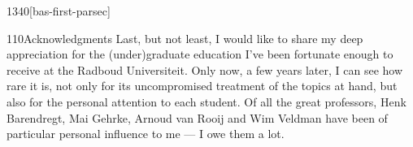 \begin{parsec}{1340}[bas-first-parsec]
\begin{point}{110}{Acknowledgments}
Last, but not least, I would like to share my deep appreciation
    for the (under)graduate education
    I've been fortunate enough to receive at the Radboud Universiteit.
Only now, a few years later,
    I can see how rare it is,
    not only for its uncompromised treatment of the topics at hand,
    but also for the personal attention to each student.
Of all the great professors,
Henk Barendregt,
    Mai Gehrke, Arnoud van Rooij and Wim Veldman
    have been of particular personal influence to me --- I owe them a lot.
\end{point}
\end{parsec}


